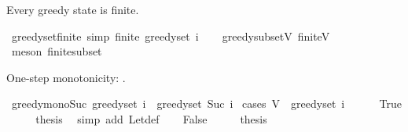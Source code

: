 \begin{isabellebody}
\isamarkupfalse%
%
\endisatagproof
{\isafoldproof}%
%
\isadelimproof
%
\endisadelimproof
%
\begin{isamarkuptext}%
Every greedy state is finite.%
\end{isamarkuptext}\isamarkuptrue%
\isamarkupfalse%
\ greedy{\isacharunderscore}{\kern0pt}set{\isacharunderscore}{\kern0pt}finite\ {\isacharbrackleft}{\kern0pt}simp{\isacharbrackright}{\kern0pt}{\isacharcolon}{\kern0pt}\ {\isachardoublequoteopen}finite\ {\isacharparenleft}{\kern0pt}greedy{\isacharunderscore}{\kern0pt}set\ i{\isacharparenright}{\kern0pt}{\isachardoublequoteclose}\isanewline
%
\isadelimproof
\ \ %
\endisadelimproof
%
\isatagproof
{}\isamarkupfalse%
\ greedy{\isacharunderscore}{\kern0pt}subset{\isacharunderscore}{\kern0pt}V\ finite{\isacharunderscore}{\kern0pt}V\ \isamarkupfalse%
\ {\isacharparenleft}{\kern0pt}meson\ finite{\isacharunderscore}{\kern0pt}subset{\isacharparenright}{\kern0pt}%
\endisatagproof
{\isafoldproof}%
%
\isadelimproof
%
\endisadelimproof
%
\begin{isamarkuptext}%
One-step monotonicity: .%
\end{isamarkuptext}\isamarkuptrue%
\isamarkupfalse%
\ greedy{\isacharunderscore}{\kern0pt}mono{\isacharunderscore}{\kern0pt}Suc{\isacharcolon}{\kern0pt}\ {\isachardoublequoteopen}greedy{\isacharunderscore}{\kern0pt}set\ i\ {\isasymsubseteq}\ greedy{\isacharunderscore}{\kern0pt}set\ {\isacharparenleft}{\kern0pt}Suc\ i{\isacharparenright}{\kern0pt}{\isachardoublequoteclose}\isanewline
%
\isadelimproof
%
\endisadelimproof
%
\isatagproof
{}\isamarkupfalse%
\ {\isacharparenleft}{\kern0pt}cases\ {\isachardoublequoteopen}V\ {\isacharminus}{\kern0pt}\ greedy{\isacharunderscore}{\kern0pt}set\ i\ {\isacharequal}{\kern0pt}\ {\isacharbraceleft}{\kern0pt}{\isacharbraceright}{\kern0pt}{\isachardoublequoteclose}{\isacharparenright}{\kern0pt}\isanewline
\ \ \isamarkupfalse%
\ True\isanewline
\ \ \isamarkupfalse%
\ \isamarkupfalse%
\ {\isacharquery}{\kern0pt}thesis\ \isamarkupfalse%
\ {\isacharparenleft}{\kern0pt}simp\ add{\isacharcolon}{\kern0pt}\ Let{\isacharunderscore}{\kern0pt}def{\isacharparenright}{\kern0pt}\isanewline
{}\isamarkupfalse%
\isanewline
\ \ \isamarkupfalse%
\ False\isanewline
\ \ \isamarkupfalse%
\ \isamarkupfalse%
\ {\isacharquery}{\kern0pt}thesis\ \isamarkupfalse%

\end{isabellebody}
